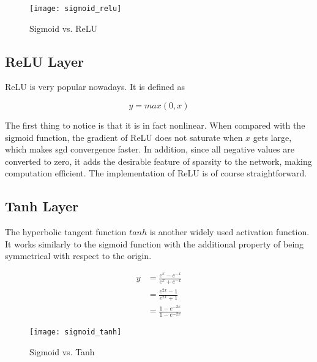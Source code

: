 \begin{figure}[h]
  \centering
  \texttt{[image: sigmoid\_relu]}
  \caption{Sigmoid vs. ReLU}
  \label{fig:sigmoid_relu}
\end{figure}

\subsection{ReLU Layer}

ReLU is very popular nowadays. It is defined as

\begin{equation} \label{eq:relu}
  y = max(0, x)
\end{equation}

The first thing to notice is that it is in fact nonlinear. When compared with the sigmoid function, the
gradient of ReLU does not saturate when $x$ gets large, which makes \gls{sgd} convergence faster. In addition,
since all negative values are converted to zero, it adds the desirable feature of sparsity to the network,
making computation efficient. The implementation of ReLU is of course straightforward.

\subsection{Tanh Layer}

The hyperbolic tangent function $tanh$ is another widely used activation function. It works similarly to the
sigmoid function with the additional property of being symmetrical with respect to the origin.

\begin{equation} \label{eq:tanh}
  \begin{split}
    y & = \frac{e^x - e^{-x}}{e^{x} + e^{-x}} \\
      & = \frac{e^{2x} - 1}{e^{2x} + 1} \\
      & = \frac{1- e^{-2x}}{1 - e^{-2x}}
  \end{split}
\end{equation}

\begin{figure}[h]
  \centering
  \texttt{[image: sigmoid\_tanh]}
  \caption{Sigmoid vs. Tanh}
  \label{fig:sigmoid_tanh}
\end{figure}

\clearpage %

